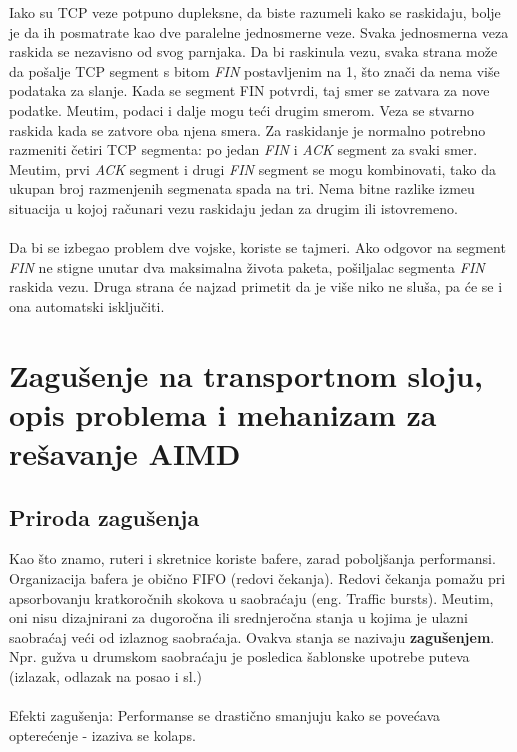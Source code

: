 \documentclass{article} %
\begin{document}
Iako su TCP veze potpuno dupleksne, da biste razumeli kako se raskidaju, bolje je da ih posmatrate kao dve paralelne jednosmerne veze. Svaka jednosmerna veza raskida se nezavisno od svog parnjaka. Da bi raskinula vezu, svaka strana mo\v ze da po\v salje TCP segment s bitom \textit{FIN} postavljenim na 1, \v sto zna\v ci da nema vi\v se podataka za slanje. Kada se segment FIN potvrdi, taj smer se zatvara za nove podatke. Me\dj utim, podaci i dalje mogu te\' ci drugim smerom. Veza se stvarno raskida kada se zatvore oba njena smera. Za raskidanje je normalno potrebno razmeniti \v cetiri TCP segmenta: po jedan \textit{FIN} i \textit{ACK} segment za svaki smer. Me\dj utim, prvi \textit{ACK} segment i drugi \textit{FIN} segment se mogu kombinovati, tako da ukupan broj razmenjenih segmenata spada na tri. Nema bitne razlike izme\dj u situacija u kojoj ra\v cunari vezu raskidaju jedan za drugim ili istovremeno.
\\
\\ Da bi se izbegao problem dve vojske, koriste se tajmeri. Ako odgovor na segment \textit{FIN} ne stigne unutar dva maksimalna \v zivota paketa, po\v siljalac segmenta \textit{FIN} raskida vezu. Druga strana \' ce najzad primetit da je vi\v se niko ne slu\v sa, pa \' ce se i ona automatski isklju\v citi.



\section{Zagu\v senje na transportnom sloju, opis problema i mehanizam za re\v savanje AIMD}

\subsection{Priroda zagu\v senja}

\noindent Kao \v sto znamo, ruteri i skretnice koriste bafere, zarad pobolj\v sanja performansi. Organizacija bafera je obi\v cno FIFO (redovi \v cekanja). Redovi \v cekanja poma\v zu pri apsorbovanju kratkoro\v cnih skokova u saobra\' caju (eng. Traffic bursts). Me\dj utim, oni nisu dizajnirani za dugoro\v cna ili srednjero\v cna stanja u kojima je ulazni saobra\' caj ve\' ci od izlaznog saobra\' caja. Ovakva stanja se nazivaju \textbf{zagu\v senjem}. Npr. gu\v zva u drumskom saobra\' caju je posledica \v sablonske upotrebe puteva (izlazak, odlazak na posao i sl.)
\\
\\ Efekti zagu\v senja: Performanse se drasti\v cno smanjuju kako se pove\' cava optere\' cenje - izaziva se kolaps.
\end{document}
